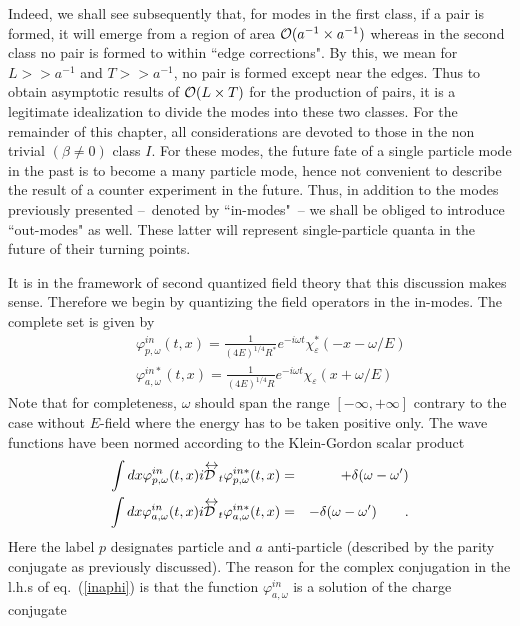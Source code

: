\documentclass[12pt,oneside]{report}
\def\lrD{\mathrel{{\cal D}\kern-.75em\raise1.75ex\hbox{$\leftrightarrow$}}}
\begin{document}
\par Indeed, we shall see subsequently  that, for modes in the first class,
if a
pair is formed, it will emerge from a region of area ${\cal O}(a^{-1}\times a^{-1})$
whereas
in the second class no pair is formed to within ``edge corrections". By
this, we mean 
for $L>>a^{-1}$ and $T>>a^{-1}$, no pair is formed except near the edges.
Thus to obtain
asymptotic results of ${\cal O}(L\times T)$ for the production of pairs, it is a
legitimate idealization to divide the modes into these two classes. For the
remainder
of this chapter, all considerations are devoted to those in the non trivial
$(\beta
\neq 0)$ class $I$. For these modes, the future fate of a single particle
mode in the
past is to become a many particle mode, hence not convenient 
to describe the result
of a counter experiment  in the future. Thus, in addition to the modes
previously
presented --~denoted by  ``in-modes"~-- we shall be obliged to introduce
``out-modes" as well. These latter will represent single-particle quanta
in the future of their turning points. 
\par It is in the framework of second quantized field theory that this discussion
makes sense. Therefore we begin by quantizing the field
operators in
the in-modes. The complete set is given by
\begin{eqnarray}
&& \varphi^{in}_{p,\omega}(t,x) =\frac{1}{(4 E)^{1/4} R^{*}} 
e^{-i\omega t}  \chi^{*}_{\varepsilon}(-x - \omega/E)
\label{inpphi} \\
&& \varphi^{in*}_{a,\omega}(t,x) =\frac{1}{(4 E)^{1/4} R}
 e^{-i \omega t} \chi_{\varepsilon} (x+\omega/E)
\label{inaphi}
\end{eqnarray}
Note that for completeness, $\omega$ should span the range $[-\infty, +\infty]$
 contrary to the case without $E$-field
where the energy has to be taken positive only.
The wave functions have been 
normed according to the Klein-Gordon scalar product
\begin{eqnarray}
\int dx \varphi^{in}_{p,\omega}(t,x) i{\lrD _t}\varphi^{in*}_{p,\omega}(t,x)
&=&+\delta(\omega-\omega^\prime)\nonumber\\
\int dx \varphi^{in}_{a,\omega}(t,x)i {\lrD _t}\varphi^{in*}_{a,\omega}(t,x)
&=&-\delta(\omega-\omega^\prime)\qquad.
\end{eqnarray}
Here the label $p$ designates particle and $a$ anti-particle (described
by the parity
conjugate as previously discussed). The reason for the complex conjugation
in the l.h.s of eq.~(\ref{inaphi}) is that
the function $\varphi^{in}_{a,\omega}$ is a solution of the charge conjugate 
\end{document}
